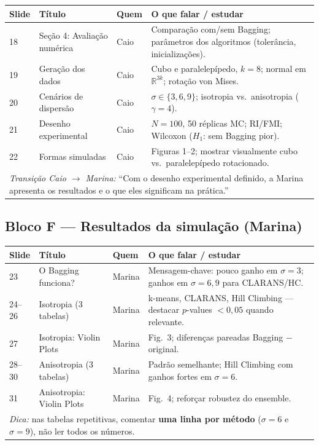 \documentclass[12pt,a4paper]{article}
\begin{document}
\begin{longtable}{@{}p{1.2cm}p{5.5cm}p{2.2cm}p{5.8cm}@{}}
\toprule
\textbf{Slide} & \textbf{Título} & \textbf{Quem} & \textbf{O que falar / estudar} \\
\midrule
\endhead
18 & Seção 4: Avaliação numérica & Caio & Comparação com/sem Bagging; parâmetros dos algoritmos (tolerância, inicializações). \\
19 & Geração dos dados & Caio & Cubo e paralelepípedo, $k=8$; normal em $\mathbb{R}^{3k}$; rotação von Mises. \\
20 & Cenários de dispersão & Caio & $\sigma \in \{3,6,9\}$; isotropia vs.\ anisotropia ($\gamma=4$). \\
21 & Desenho experimental & Caio & $N=100$, 50 réplicas MC; RI/FMI; Wilcoxon ($H_1$: sem Bagging pior). \\
22 & Formas simuladas & Caio & Figuras 1--2; mostrar visualmente cubo vs.\ paralelepípedo rotacionado. \\
\midrule
\multicolumn{4}{l}{\textit{Transição Caio $\rightarrow$ Marina:} ``Com o desenho experimental definido, a Marina apresenta os resultados e o que eles significam na prática.''} \\
\bottomrule
\end{longtable}

\subsection{Bloco F --- Resultados da simulação (Marina)}

\begin{longtable}{@{}p{1.2cm}p{5.5cm}p{2.2cm}p{5.8cm}@{}}
\toprule
\textbf{Slide} & \textbf{Título} & \textbf{Quem} & \textbf{O que falar / estudar} \\
\midrule
\endhead
23 & O Bagging funciona? & Marina & Mensagem-chave: pouco ganho em $\sigma=3$; ganhos em $\sigma=6,9$ para CLARANS/HC. \\
24--26 & Isotropia (3 tabelas) & Marina & k-means, CLARANS, Hill Climbing --- destacar $p$-values $<0{,}05$ quando relevante. \\
27 & Isotropia: Violin Plots & Marina & Fig.\ 3; diferenças pareadas Bagging $-$ original. \\
28--30 & Anisotropia (3 tabelas) & Marina & Padrão semelhante; Hill Climbing com ganhos fortes em $\sigma=6$. \\
31 & Anisotropia: Violin Plots & Marina & Fig.\ 4; reforçar robustez do ensemble. \\
\midrule
\multicolumn{4}{l}{\textit{Dica:} nas tabelas repetitivas, comentar \textbf{uma linha por método} ($\sigma=6$ e $\sigma=9$), não ler todos os números.} \\
\bottomrule
\end{longtable}
\end{document}

